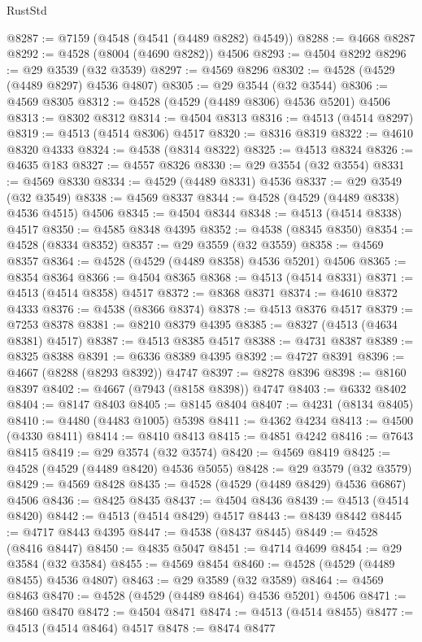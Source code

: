 \begin{lexlean}{RustStd}
\begin{coremodule}
@8287 := @7159 (@4548 (@4541 (@4489 @8282) @4549))
@8288 := @4668 @8287
@8292 := @4528 (@8004 (@4690 @8282)) @4506
@8293 := @4504 @8292
@8296 := @29 @3539 (@32 @3539)
@8297 := @4569 @8296
@8302 := @4528 (@4529 (@4489 @8297) @4536 @4807)
@8305 := @29 @3544 (@32 @3544)
@8306 := @4569 @8305
@8312 := @4528 (@4529 (@4489 @8306) @4536 @5201) @4506
@8313 := @8302 @8312
@8314 := @4504 @8313
@8316 := @4513 (@4514 @8297)
@8319 := @4513 (@4514 @8306) @4517
@8320 := @8316 @8319
@8322 := @4610 @8320 @4333
@8324 := @4538 (@8314 @8322)
@8325 := @4513 @8324
@8326 := @4635 @183
@8327 := @4557 @8326
@8330 := @29 @3554 (@32 @3554)
@8331 := @4569 @8330
@8334 := @4529 (@4489 @8331) @4536
@8337 := @29 @3549 (@32 @3549)
@8338 := @4569 @8337
@8344 := @4528 (@4529 (@4489 @8338) @4536 @4515) @4506
@8345 := @4504 @8344
@8348 := @4513 (@4514 @8338) @4517
@8350 := @4585 @8348 @4395
@8352 := @4538 (@8345 @8350)
@8354 := @4528 (@8334 @8352)
@8357 := @29 @3559 (@32 @3559)
@8358 := @4569 @8357
@8364 := @4528 (@4529 (@4489 @8358) @4536 @5201) @4506
@8365 := @8354 @8364
@8366 := @4504 @8365
@8368 := @4513 (@4514 @8331)
@8371 := @4513 (@4514 @8358) @4517
@8372 := @8368 @8371
@8374 := @4610 @8372 @4333
@8376 := @4538 (@8366 @8374)
@8378 := @4513 @8376 @4517
@8379 := @7253 @8378
@8381 := @8210 @8379 @4395
@8385 := @8327 (@4513 (@4634 @8381) @4517)
@8387 := @4513 @8385 @4517
@8388 := @4731 @8387
@8389 := @8325 @8388
@8391 := @6336 @8389 @4395
@8392 := @4727 @8391
@8396 := @4667 (@8288 (@8293 @8392)) @4747
@8397 := @8278 @8396
@8398 := @8160 @8397
@8402 := @4667 (@7943 (@8158 @8398)) @4747
@8403 := @6332 @8402
@8404 := @8147 @8403
@8405 := @8145 @8404
@8407 := @4231 (@8134 @8405)
@8410 := @4480 (@4483 @1005) @5398
@8411 := @4362 @4234
@8413 := @4500 (@4330 @8411)
@8414 := @8410 @8413
@8415 := @4851 @4242
@8416 := @7643 @8415
@8419 := @29 @3574 (@32 @3574)
@8420 := @4569 @8419
@8425 := @4528 (@4529 (@4489 @8420) @4536 @5055)
@8428 := @29 @3579 (@32 @3579)
@8429 := @4569 @8428
@8435 := @4528 (@4529 (@4489 @8429) @4536 @6867) @4506
@8436 := @8425 @8435
@8437 := @4504 @8436
@8439 := @4513 (@4514 @8420)
@8442 := @4513 (@4514 @8429) @4517
@8443 := @8439 @8442
@8445 := @4717 @8443 @4395
@8447 := @4538 (@8437 @8445)
@8449 := @4528 (@8416 @8447)
@8450 := @4835 @5047
@8451 := @4714 @4699
@8454 := @29 @3584 (@32 @3584)
@8455 := @4569 @8454
@8460 := @4528 (@4529 (@4489 @8455) @4536 @4807)
@8463 := @29 @3589 (@32 @3589)
@8464 := @4569 @8463
@8470 := @4528 (@4529 (@4489 @8464) @4536 @5201) @4506
@8471 := @8460 @8470
@8472 := @4504 @8471
@8474 := @4513 (@4514 @8455)
@8477 := @4513 (@4514 @8464) @4517
@8478 := @8474 @8477

\end{coremodule}
\end{lexlean}

